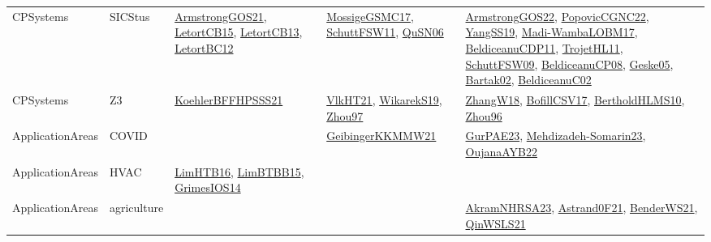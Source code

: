 {\begin{longtable}{lp{3cm}>{\raggedright}p{6cm}>{\raggedright}p{6cm}p{8cm}}
CPSystems & SICStus & \href{papers/ArmstrongGOS21.pdf}{ArmstrongGOS21}\cite{ArmstrongGOS21}, \href{articles/LetortCB15.pdf}{LetortCB15}\cite{LetortCB15}, \href{papers/LetortCB13.pdf}{LetortCB13}\cite{LetortCB13}, \href{papers/LetortBC12.pdf}{LetortBC12}\cite{LetortBC12} & \href{papers/MossigeGSMC17.pdf}{MossigeGSMC17}\cite{MossigeGSMC17}, \href{articles/SchuttFSW11.pdf}{SchuttFSW11}\cite{SchuttFSW11}, \href{papers/QuSN06.pdf}{QuSN06}\cite{QuSN06} & \href{papers/ArmstrongGOS22.pdf}{ArmstrongGOS22}\cite{ArmstrongGOS22}, \href{papers/PopovicCGNC22.pdf}{PopovicCGNC22}\cite{PopovicCGNC22}, \href{papers/YangSS19.pdf}{YangSS19}\cite{YangSS19}, \href{papers/Madi-WambaLOBM17.pdf}{Madi-WambaLOBM17}\cite{Madi-WambaLOBM17}, \href{articles/BeldiceanuCDP11.pdf}{BeldiceanuCDP11}\cite{BeldiceanuCDP11}, \href{articles/TrojetHL11.pdf}{TrojetHL11}\cite{TrojetHL11}, \href{papers/SchuttFSW09.pdf}{SchuttFSW09}\cite{SchuttFSW09}, \href{papers/BeldiceanuCP08.pdf}{BeldiceanuCP08}\cite{BeldiceanuCP08}, \href{papers/Geske05.pdf}{Geske05}\cite{Geske05}, \href{papers/Bartak02.pdf}{Bartak02}\cite{Bartak02}, \href{papers/BeldiceanuC02.pdf}{BeldiceanuC02}\cite{BeldiceanuC02}\\
CPSystems & Z3 & \href{articles/KoehlerBFFHPSSS21.pdf}{KoehlerBFFHPSSS21}\cite{KoehlerBFFHPSSS21} & \href{articles/VlkHT21.pdf}{VlkHT21}\cite{VlkHT21}, \href{articles/WikarekS19.pdf}{WikarekS19}\cite{WikarekS19}, \href{articles/Zhou97.pdf}{Zhou97}\cite{Zhou97} & \href{articles/ZhangW18.pdf}{ZhangW18}\cite{ZhangW18}, \href{papers/BofillCSV17.pdf}{BofillCSV17}\cite{BofillCSV17}, \href{papers/BertholdHLMS10.pdf}{BertholdHLMS10}\cite{BertholdHLMS10}, \href{papers/Zhou96.pdf}{Zhou96}\cite{Zhou96}\\
ApplicationAreas & COVID &  & \href{papers/GeibingerKKMMW21.pdf}{GeibingerKKMMW21}\cite{GeibingerKKMMW21} & \href{articles/GurPAE23.pdf}{GurPAE23}\cite{GurPAE23}, \href{papers/Mehdizadeh-Somarin23.pdf}{Mehdizadeh-Somarin23}\cite{Mehdizadeh-Somarin23}, \href{papers/OujanaAYB22.pdf}{OujanaAYB22}\cite{OujanaAYB22}\\
ApplicationAreas & HVAC & \href{papers/LimHTB16.pdf}{LimHTB16}\cite{LimHTB16}, \href{papers/LimBTBB15.pdf}{LimBTBB15}\cite{LimBTBB15}, \href{articles/GrimesIOS14.pdf}{GrimesIOS14}\cite{GrimesIOS14} &  & \\
ApplicationAreas & agriculture &  &  & \href{articles/AkramNHRSA23.pdf}{AkramNHRSA23}\cite{AkramNHRSA23}, \href{papers/Astrand0F21.pdf}{Astrand0F21}\cite{Astrand0F21}, \href{papers/BenderWS21.pdf}{BenderWS21}\cite{BenderWS21}, \href{articles/QinWSLS21.pdf}{QinWSLS21}\cite{QinWSLS21}\\

\end{longtable}}
